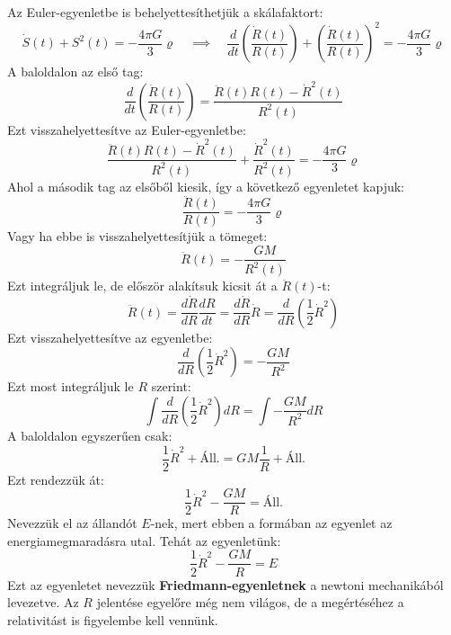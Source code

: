 \documentclass[../main.tex]{subfiles}
\begin{document}
Az Euler-egyenletbe is behelyettesíthetjük a skálafaktort:
\begin{equation}
    \dot{S}(t) + S^2(t) = - \frac{4 \pi G}{3} \varrho \quad \implies \quad \frac{d}{d t} \left(\frac{\dot{R}(t)}{R(t)}\right) + \left(\frac{\dot{R}(t)}{R(t)}\right)^2 = - \frac{4 \pi G}{3} \varrho
\end{equation}
A baloldalon az első tag:
\begin{equation}
    \frac{d}{d t} \left(\frac{\dot{R}(t)}{R(t)}\right) = \frac{\ddot{R}(t) R(t) - \dot{R}^2(t)}{R^2(t)}
\end{equation}
Ezt visszahelyettesítve az Euler-egyenletbe:
\begin{equation}
    \frac{\ddot{R}(t) R(t) - \dot{R}^2(t)}{R^2(t)} + \frac{\dot{R}^2(t)}{R^2(t)} = - \frac{4 \pi G}{3} \varrho
\end{equation}
Ahol a második tag az elsőből kiesik, így a következő egyenletet kapjuk:
\begin{equation}
    \frac{\ddot{R}(t)}{R(t)} = - \frac{4 \pi G}{3} \varrho
\end{equation}
Vagy ha ebbe is visszahelyettesítjük a tömeget:
\begin{equation}
    \ddot{R}(t) = - \frac{G M}{R^2(t)}
\end{equation}
Ezt integráljuk le, de először alakítsuk kicsit át a $\ddot{R}(t)$-t:
\begin{equation}
    \ddot{R}(t) = \frac{d \dot{R}}{d R} \frac{d R}{d t} = \frac{d \dot{R}}{d R} \dot{R} = \frac{d}{d R} \left(\frac{1}{2} \dot{R}^2\right)
\end{equation}
Ezt visszahelyettesítve az egyenletbe:
\begin{equation}
    \frac{d}{d R} \left(\frac{1}{2} \dot{R}^2\right) = - \frac{G M}{R^2}
\end{equation}
Ezt most integráljuk le $R$ szerint:
\begin{equation}
    \int \frac{d}{d R} \left(\frac{1}{2} \dot{R}^2\right) d R = \int - \frac{G M}{R^2} d R
\end{equation}
A baloldalon egyszerűen csak:
\begin{equation}
    \frac{1}{2} \dot{R}^2 + \text{Áll.} = G M \frac{1}{R} + \text{Áll.}
\end{equation}
Ezt rendezzük át:
\begin{equation}
    \frac{1}{2} \dot{R}^2 - \frac{G M}{R} = \text{Áll.}
\end{equation}
Nevezzük el az állandót $E$-nek, mert ebben a formában az egyenlet az energiamegmaradásra utal. Tehát az egyenletünk:
\begin{equation}
    \boxed{\frac{1}{2} \dot{R}^2 - \frac{G M}{R} = E}
\end{equation}
Ezt az egyenletet nevezzük \textbf{Friedmann-egyenletnek} a newtoni mechanikából levezetve. Az $R$ jelentése egyelőre még nem világos, de a megértéséhez a relativitást is figyelembe kell vennünk.
\end{document}
